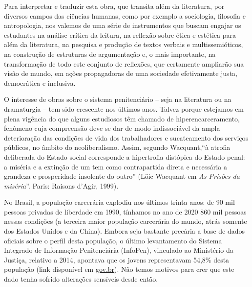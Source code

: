 \documentclass[11pt]{extarticle}
\begin{document}
Para interpretar e traduzir esta obra, que transita além da literatura,
por diversos campos das ciências humanas, como por exemplo a sociologia,
filosofia e antropologia, nos valemos de uma série de instrumentos que
buscam engajar os estudantes na análise crítica da leitura, na reflexão
sobre ética e estética para além da literatura, na pesquisa e produção
de textos verbais e multissemióticos, na construção de estruturas de
argumentação e, o mais importante, na transformação de todo este
conjunto de reflexões, que certamente ampliarão sua visão de mundo, em
ações propagadoras de uma sociedade efetivamente justa, democrática e
inclusiva.

O interesse de obras sobre o sistema penitenciário -- seja na literatura
ou na dramaturgia -- tem sido crescente nos últimos anos. Talvez porque
estejamos em plena vigência do que alguns estudiosos têm chamado de
hiperencarceramento, fenômeno cuja compreensão deve se dar de modo
indissociável da ampla deterioração das condições de vida dos
trabalhadores e sucateamento dos serviços públicos, no âmbito do
neoliberalismo. Assim, segundo Wacquant,``à atrofia deliberada do
Estado social corresponde a hipertrofia distópica do Estado penal: a
miséria e a extinção de um tem como contrapartida direta e necessária a
grandeza e prosperidade insolente do outro'' (Löic Wacquant em \emph{As
Prisões da miséria}''. Paris: Raisons d'Agir, 1999).

No Brasil, a população carcerária explodiu nos últimos trinta anos: de
90 mil pessoas privadas de liberdade em 1990, tínhamos no ano de 2020
860 mil pessoas nessas condições (a terceira maior população carcerária
do mundo, atrás somente dos Estados Unidos e da China). Embora seja
bastante precária a base de dados oficiais sobre o perfil desta
população, o último levantamento do Sistema Integrado de Informação
Penitenciária (InfoPen), vinculado ao Ministério da Justiça, relativo a
2014, apontava que os jovens representavam 54,8\% desta população 
(link disponível em 
\href{https://www.gov.br/mdh/pt-br/noticias\_seppir/noticias/junho/mapa-do-encarceramento-aponta-maioria-da-populacao-carceraria-e-negra-1}{gov.br}).
Não temos motivos para crer que este dado tenha sofrido alterações
sensíveis desde então.

\end{document}
